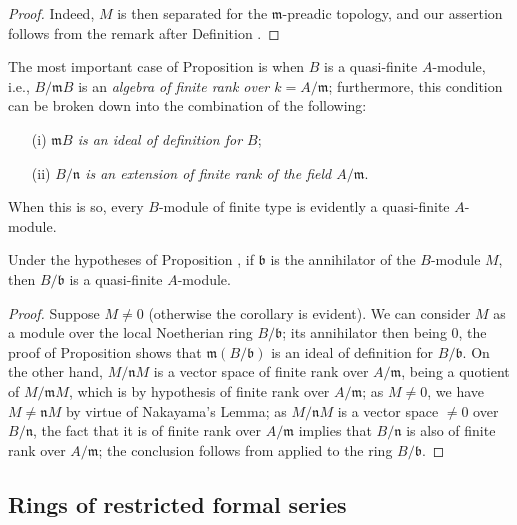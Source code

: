 \begin{proof}
Indeed, $M$ is then separated for the $\mathfrak{m}$-preadic topology, and our assertion
follows from the remark after Definition .
\end{proof}

\begin{env}[7.4.4]
\label{0.7.4.4}
The most important case of Proposition  is when $B$ is a
quasi-finite $A$-module, i.e., $B/\mathfrak{m}B$ is an \emph{algebra of finite rank over
$k=A/\mathfrak{m}$}; furthermore, this condition can be broken down into the combination
of the following:
\begin{enumerate}
  \item[(i)] \emph{$\mathfrak{m}B$ is an ideal of definition for $B$};
  \item[(ii)] \emph{$B/\mathfrak{n}$ is an extension of finite rank of the field $A/\mathfrak{m}$}.
\end{enumerate}
When this is so, every $B$-module of finite type is evidently a quasi-finite $A$-module.
\end{env}

\begin{corollary}[7.4.5]
\label{0.7.4.5}
Under the hypotheses of Proposition , if
$\mathfrak{b}$ is the annihilator of the $B$-module $M$, then $B/\mathfrak{b}$ is a
quasi-finite $A$-module.
\end{corollary}

\begin{proof}
Suppose $M\neq 0$ (otherwise the corollary is evident). We can consider $M$ as a
module over the local Noetherian ring $B/\mathfrak{b}$; its annihilator then being
$0$, the proof of Proposition  shows that
$\mathfrak{m}(B/\mathfrak{b})$ is an ideal of definition for $B/\mathfrak{b}$.
On the other hand, $M/\mathfrak{n}M$ is a vector space of finite rank over
$A/\mathfrak{m}$, being a quotient of $M/\mathfrak{m}M$, which is by hypothesis of
finite rank over $A/\mathfrak{m}$; as $M\neq 0$, we have $M\neq\mathfrak{n}M$ by
virtue of Nakayama's Lemma; as $M/\mathfrak{n}M$ is a vector space $\neq 0$ over
$B/\mathfrak{n}$, the fact that it is of finite rank over $A/\mathfrak{m}$ implies
that $B/\mathfrak{n}$ is also of finite rank over $A/\mathfrak{m}$; the conclusion
follows from  applied to the ring $B/\mathfrak{b}$.
\end{proof}

\subsection{Rings of restricted formal series}
\label{subsection:0.7.5}

